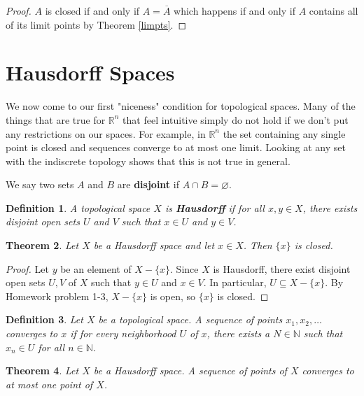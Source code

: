 \documentclass[a4paper]{article}
\newtheorem{theorem}{Theorem}
\newtheorem{definition}[theorem]{Definition}
\numberwithin{theorem}{section}
\begin{document}
\begin{proof}
$A$ is closed if and only if $A = \overline{A}$ which happens if and only if $A$ contains all of its limit points by Theorem \ref{limpts}.
\end{proof}

\section{Hausdorff Spaces}

We now come to our first "niceness" condition for topological spaces. Many of the things that are true for $\mathbb{R}^n$ that feel intuitive simply do not hold if we don't put any restrictions on our spaces. For example, in $\mathbb{R}^n$ the set containing any single point is closed and sequences converge to at most one limit. Looking at any set with the indiscrete topology shows that this is not true in general.

We say two sets $A$ and $B$ are \textbf{disjoint} if $A \cap B = \varnothing$.

\begin{definition}
A topological space $X$ is \textbf{Hausdorff} if for all $x,y \in X$, there exists disjoint open sets $U$ and $V$ such that $x \in U$ and $y \in V$.
\end{definition}

\begin{theorem}
Let $X$ be a Hausdorff space and let $x \in X$. Then $\{x\}$ is closed.
\end{theorem}

\begin{proof}
Let $y$ be an element of $X-\{x\}$. Since $X$ is Hausdorff, there exist disjoint open sets $U,V$ of $X$ such that $y \in U$ and $x \in V$. In particular, $U \subseteq X - \{x\}$. By Homework problem 1-3, $X-\{x\}$ is open, so $\{x\}$ is closed.
\end{proof}

\begin{definition}
Let $X$ be a topological space. A sequence of points $x_1,x_2,\dots$ converges to $x$ if for every neighborhood $U$ of $x$, there exists a $N \in \mathbb{N}$ such that $x_n \in U$ for all $n \in \mathbb{N}$. 
\end{definition}

\begin{theorem}
Let $X$ be a Hausdorff space. A sequence of points of $X$ converges to at most one point of $X$.
\end{theorem}
\end{document}
